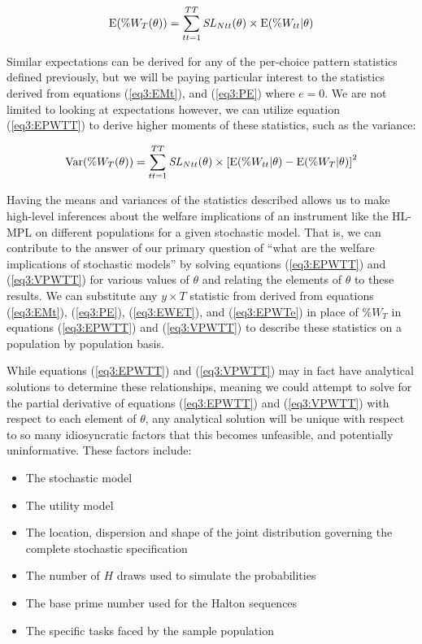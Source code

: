 \documentclass[../main.tex]{subfiles}
\begin{document}
\begin{equation}
	\label{eq3:EPWTT}
	\operatorname{E}(\%W_T(\theta)) = \sum_{tt=1}^{TT} \mathit{SL}_{Ntt}(\theta) \times \operatorname{E}(\%W_{tt} | \theta)
\end{equation}

Similar expectations can be derived for any of the per-choice pattern statistics defined previously, but we will be paying particular interest to the statistics derived from equations (\ref{eq3:EMt}), and (\ref{eq3:PE}) where $e=0$.
We are not limited to looking at expectations however, we can utilize equation (\ref{eq3:EPWTT}) to derive higher moments of these statistics, such as the variance:

\begin{equation}
	\label{eq3:VPWTT}
	\operatorname{Var}(\%W_T(\theta)) = \sum_{tt=1}^{TT} \mathit{SL}_{Ntt}(\theta) \times \left[ \operatorname{E}(\%W_{tt} | \theta) - \operatorname{E}(\%W_T | \theta) \right]^2
\end{equation}

Having the means and variances of the statistics described allows us to make high-level inferences about the welfare implications of an instrument like the HL-MPL on different populations for a given stochastic model.
That is, we can contribute to the answer of our primary question of \enquote{what are the welfare implications of stochastic models} by solving equations (\ref{eq3:EPWTT}) and (\ref{eq3:VPWTT}) for various values of $\theta$ and relating the elements of $\theta$ to these results.
We can substitute any  $y \times T$ statistic from derived from equations (\ref{eq3:EMt}), (\ref{eq3:PE}), (\ref{eq3:EWET}), and (\ref{eq3:EPWTe}) in place of $\%W_T$ in equations (\ref{eq3:EPWTT}) and (\ref{eq3:VPWTT}) to describe these statistics on a population by population basis.

While equations (\ref{eq3:EPWTT}) and (\ref{eq3:VPWTT}) may in fact have analytical solutions to determine these relationships, meaning we could attempt to solve for the partial derivative of equations (\ref{eq3:EPWTT}) and (\ref{eq3:VPWTT}) with respect to each element of $\theta$, any analytical solution will be unique with respect to so many idiosyncratic factors that this becomes unfeasible, and potentially uninformative.
These factors include:
\begin{itemize}
 \setlength\itemsep{-.25em}
	\item The stochastic model
	\item The utility model
	\item The location, dispersion and shape of the joint distribution governing the complete stochastic specification
	\item The number of $H$ draws used to simulate the probabilities
	\item The base prime number used for the Halton sequences
	\item The specific tasks faced by the sample population
\end{itemize}
\end{document}
